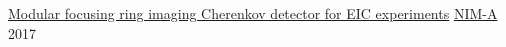 
\headedsection
{\href{http://inspirehep.net/record/1614745}{Modular focusing ring imaging Cherenkov detector for EIC experiments}}
{\textsc{\href{https://www.journals.elsevier.com/nuclear-instruments-and-methods-in-physics-research-section-a-accelerators-spectrometers-detectors-and-associated-equipment}{NIM-A} 2017}}{}